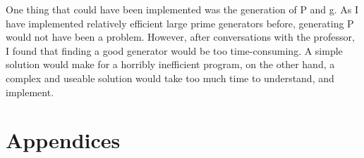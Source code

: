 \documentclass{article}
\begin{document}
One thing that could have been implemented was the generation of P and g. As I have implemented relatively efficient large prime generators before, generating P would not have been a problem. However, after conversations with the professor, I found that finding a good generator would be too time-consuming. A simple solution would make for a horribly inefficient program, on the other hand, a complex and useable solution would take too much time to understand, and implement.
\newpage

\nocite{*}




\newpage

\section{Appendices}
\end{document}
